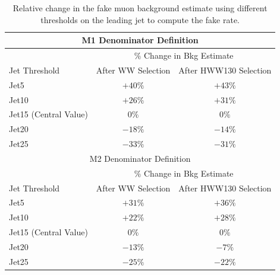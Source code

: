 \begin{table}[!htbp]
\begin{center}
\begin{tabular}{|l|c|c|}
\hline
\multicolumn{3}{|c|}{ M1 Denominator Definition} \\
\hline
                        & \multicolumn{2}{|c|}{ $\%$ Change in Bkg Estimate} \\
\hline
Jet Threshold           & After WW Selection  & After HWW130 Selection \\
\hline
Jet5                    &  $+40\%$     & $+43\%$     \\
Jet10                   &  $+26\%$     & $+31\%$     \\
Jet15 (Central Value)   &  $0\%$       & $0\%$       \\
Jet20                   &  $-18\%$     & $-14\%$     \\
Jet25                   &  $-33\%$     & $-31\%$     \\
\hline

\hline
\multicolumn{3}{|c|}{ M2 Denominator Definition} \\
\hline
                        & \multicolumn{2}{|c|}{ $\%$ Change in Bkg Estimate} \\
\hline
Jet Threshold           & After WW Selection  & After HWW130 Selection \\
\hline

Jet5                    &  $+31\%$     & $+36\%$    \\
Jet10                   &  $+22\%$     & $+28\%$    \\
Jet15 (Central Value)   &  $0\%$       & $0\%$      \\
Jet20                   &  $-13\%$     & $-7\%$     \\
Jet25                   &  $-25\%$     & $-22\%$    \\

\hline

\hline
\end{tabular}
\caption{Relative change in the fake muon background estimate using different thresholds on the leading jet to compute the fake rate. }
\label{tab:mu_fr_JetSpectrumSystematics}
\end{center}
\end{table}





